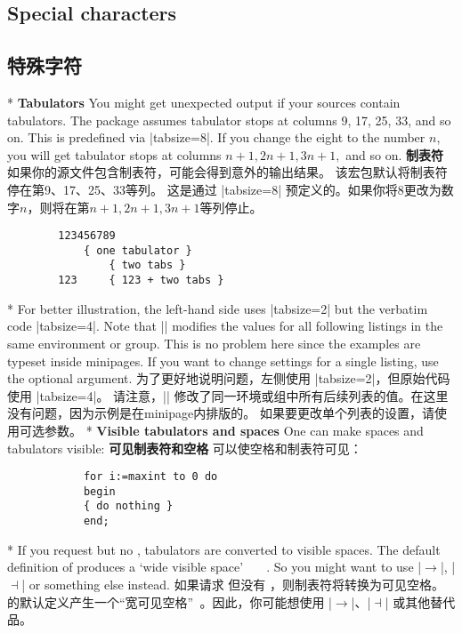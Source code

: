 \begin{paracol}{2}
\subsection{Special characters}\label{uSpecialCharacters}
\switchcolumn
\subsection{特殊字符}
\switchcolumn[0]*%
\textbf{Tabulators}
You might get unexpected output if your sources contain tabulators.
The package assumes tabulator stops at columns 9, 17, 25, 33, and so on.
This is predefined via |tabsize=8|. If you change the eight to the number
$n$, you will get tabulator stops at columns $n+1,2n+1,3n+1,$ and so on.
\switchcolumn
\textbf{制表符}
如果你的源文件包含制表符，可能会得到意外的输出结果。
该宏包默认将制表符停在第9、17、25、33等列。
这是通过 |tabsize=8| 预定义的。如果你将8更改为数字$n$，则将在第$n+1,2n+1,3n+1$等列停止。
\begin{lstsample}[tabsize]{}{}
        \lstset{tabsize=2}
        \begin{lstlisting}
        123456789
            { one tabulator }
                { two tabs }
        123     { 123 + two tabs }
        \end{lstlisting}
\end{lstsample}
\switchcolumn[0]*%
For better illustration, the left-hand side uses |tabsize=2| but the verbatim
code |tabsize=4|. Note that |\lstset| modifies the values for all following
listings in the same environment or group. This is no problem here since the
examples are typeset inside minipages. If you want to change settings for a
single listing, use the optional argument.
\switchcolumn
为了更好地说明问题，左侧使用 |tabsize=2|，但原始代码使用 |tabsize=4|。
请注意，|\lstset| 修改了同一环境或组中所有后续列表的值。在这里没有问题，因为示例是在minipage内排版的。
如果要更改单个列表的设置，请使用可选参数。
\switchcolumn[0]*%
\textbf{Visible tabulators and spaces}
One can make spaces and tabulators visible:
\switchcolumn
\textbf{可见制表符和空格}
可以使空格和制表符可见：
\begin{lstsample}{}{}
        \lstset{showspaces=true,
                showtabs=true,
                tab=\rightarrowfill}
        \begin{lstlisting}
            for i:=maxint to 0 do
            begin
            { do nothing }
            end;
        \end{lstlisting}
\end{lstsample}

\switchcolumn[0]*%
If you request  but no ,
tabulators are converted to visible spaces.
The default definition of  produces a `wide visible space'
\lstinline[showtabs]!	!. So you might want to use |$\to$|, |$\dashv$|
or something else instead.
\switchcolumn
如果请求  但没有 ，则制表符将转换为可见空格。
 的默认定义产生一个“宽可见空格”\lstinline[showtabs]! !。因此，你可能想使用 |$\to$|、|$\dashv$| 或其他替代品。
\end{paracol}
